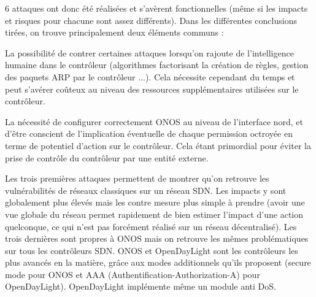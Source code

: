 6 attaques ont donc été réalisées et s'avèrent fonctionnelles (même si les impacts et risques pour chacune sont assez différents). Dans les différentes conclusions tirées, on trouve principalement deux éléments communs :

\begin{list}{\Asteriskus}{}

\item La possibilité de contrer certaines attaques lorsqu'on rajoute de l'intelligence humaine dans le contrôleur (algorithmes factorisant la création de règles, gestion des paquets ARP par le contrôleur ...). Cela nécessite cependant du temps et peut s'avérer coûteux au niveau des ressources supplémentaires utilisées sur le contrôleur.

\item La nécessité de configurer correctement ONOS au niveau de l'interface nord, et d'être conscient de l'implication éventuelle de chaque permission octroyée en terme de potentiel d'action sur le contrôleur. Cela étant primordial pour éviter la prise de contrôle du contrôleur par une entité externe.

\end{list}

Les trois premières attaques permettent de montrer qu'on retrouve les vulnérabilités de réseaux classiques sur un réseau SDN. Les impacts y sont globalement plus élevés mais les contre mesure plus simple à prendre (avoir une vue globale du réseau permet rapidement de bien estimer l'impact d'une action quelconque, ce qui n'est pas forcément réalisé sur un réseau décentralisé).
Les trois dernières sont propres à ONOS mais on retrouve les mêmes problématiques sur tous les contrôleurs SDN. ONOS et OpenDayLight sont les contrôleurs les plus avancés en la matière, grâce aux modes additionnels qu'ils proposent (secure mode pour ONOS et AAA (Authentification-Authorization-A) pour OpenDayLight). OpenDayLight implémente même un module anti DoS.